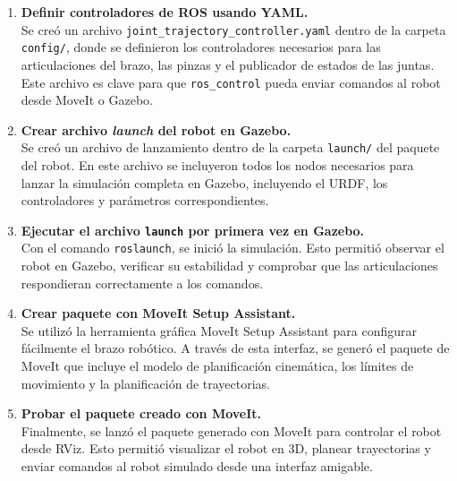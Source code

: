 \begin{enumerate}
	\item \textbf{Definir controladores de ROS usando YAML.} \\
	Se creó un archivo \texttt{joint\_trajectory\_controller.yaml} dentro de la carpeta \texttt{config/}, donde se definieron los controladores necesarios para las articulaciones del brazo, las pinzas y el publicador de estados de las juntas. Este archivo es clave para que \texttt{ros\_control} pueda enviar comandos al robot desde MoveIt o Gazebo.
	
	\item \textbf{Crear archivo \textit{launch} del robot en Gazebo.} \\
	Se creó un archivo de lanzamiento dentro de la carpeta \texttt{launch/} del paquete del robot. En este archivo se incluyeron todos los nodos necesarios para lanzar la simulación completa en Gazebo, incluyendo el URDF, los controladores y parámetros correspondientes.
	
	\item \textbf{Ejecutar el archivo \texttt{launch} por primera vez en Gazebo.} \\
	Con el comando \texttt{roslaunch}, se inició la simulación. Esto permitió observar el robot en Gazebo, verificar su estabilidad y comprobar que las articulaciones respondieran correctamente a los comandos.
	
	\item \textbf{Crear paquete con MoveIt Setup Assistant.} \\
	Se utilizó la herramienta gráfica MoveIt Setup Assistant para configurar fácilmente el brazo robótico. A través de esta interfaz, se generó el paquete de MoveIt que incluye el modelo de planificación cinemática, los límites de movimiento y la planificación de trayectorias.
	
	\item \textbf{Probar el paquete creado con MoveIt.} \\
	Finalmente, se lanzó el paquete generado con MoveIt para controlar el robot desde RViz. Esto permitió visualizar el robot en 3D, planear trayectorias y enviar comandos al robot simulado desde una interfaz amigable.
\end{enumerate}
